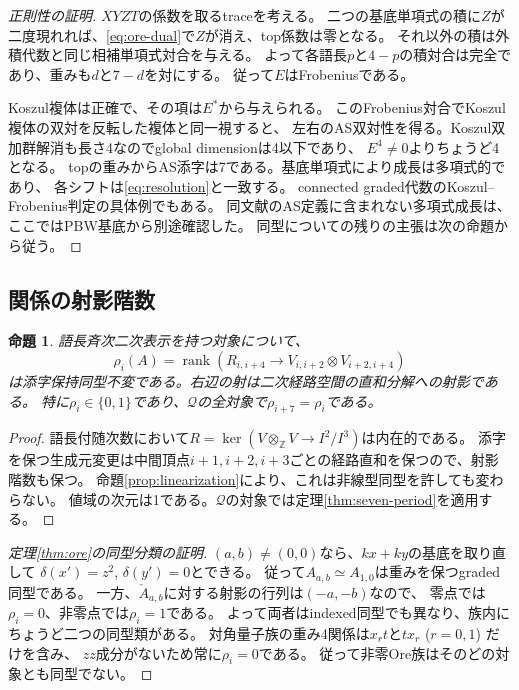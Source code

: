 \documentclass[11pt,a4paper]{ltjsarticle}
\newtheorem{proposition}[theorem]{命題}
\theoremstyle{definition}
\newcommand{\ZZ}{\mathbb Z}
\newcommand{\rk}{\operatorname{rank}}
\begin{document}
\begin{proof}[正則性の証明]
$XYZT$の係数を取るtraceを考える。
二つの基底単項式の積に$Z$が二度現れれば、\eqref{eq:ore-dual}で$Z$が消え、top係数は零となる。
それ以外の積は外積代数と同じ相補単項式対合を与える。
よって各語長$p$と$4-p$の積対合は完全であり、重みも$d$と$7-d$を対にする。
従って$E$はFrobeniusである。

Koszul複体は正確で、その項は$E^*$から与えられる。
このFrobenius対合でKoszul複体の双対を反転した複体と同一視すると、
左右のAS双対性を得る。Koszul双加群解消も長さ4なのでglobal dimensionは4以下であり、
$E^4\ne0$よりちょうど4となる。
topの重みからAS添字は7である。基底単項式により成長は多項式的であり、
各シフトは\eqref{eq:resolution}と一致する。
connected graded代数のKoszul--Frobenius判定\cite[Corollary D]{LPWZKoszul}の具体例でもある。
同文献のAS定義に含まれない多項式成長は、ここではPBW基底から別途確認した。
同型についての残りの主張は次の命題から従う。
\end{proof}

\subsection{関係の射影階数}
\begin{proposition}\label{prop:rho}
語長斉次二次表示を持つ対象について、
\[
\rho_i(A)=\rk\left(R_{i,i+4}\longrightarrow
V_{i,i+2}\otimes V_{i+2,i+4}\right)
\]
は添字保持同型不変である。右辺の射は二次経路空間の直和分解への射影である。
特に$\rho_i\in\{0,1\}$であり、$\mathcal Q$の全対象で$\rho_{i+7}=\rho_i$である。
\end{proposition}
\begin{proof}
語長付随次数において$R=\ker(V\otimes_{\ZZ}V\to I^2/I^3)$は内在的である。
添字を保つ生成元変更は中間頂点$i+1,i+2,i+3$ごとの経路直和を保つので、射影階数も保つ。
命題\ref{prop:linearization}により、これは非線型同型を許しても変わらない。
値域の次元は1である。$\mathcal Q$の対象では定理\ref{thm:seven-period}を適用する。
\end{proof}

\begin{proof}[定理\ref{thm:ore}の同型分類の証明]
$(a,b)\ne(0,0)$なら、$kx+ky$の基底を取り直して
$\delta(x')=z^2$, $\delta(y')=0$とできる。
従って$A_{a,b}\simeq A_{1,0}$は重みを保つgraded同型である。
一方、$\check A_{a,b}$に対する射影の行列は$(-a,-b)$なので、
零点では$\rho_i=0$、非零点では$\rho_i=1$である。
よって両者はindexed同型でも異なり、族内にちょうど二つの同型類がある。
対角量子族の重み4関係は$x_rt$と$tx_r$ ($r=0,1$) だけを含み、
$zz$成分がないため常に$\rho_i=0$である。
従って非零Ore族はそのどの対象とも同型でない。
\end{proof}
\end{document}
